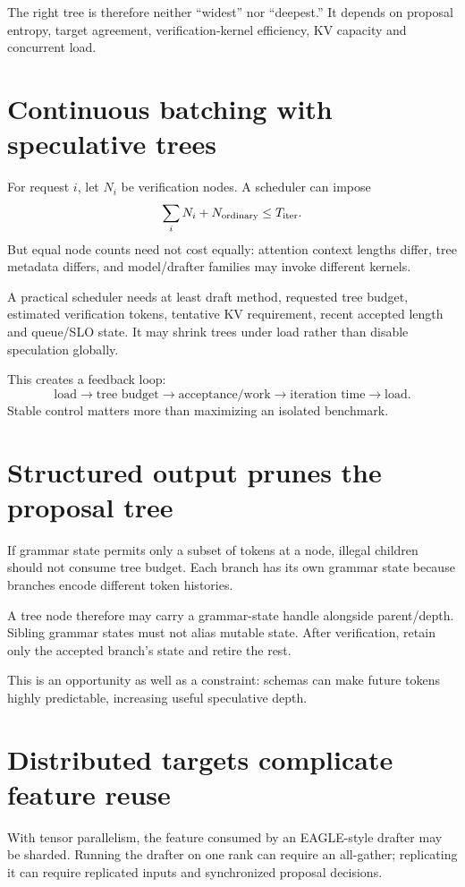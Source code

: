 The right tree is therefore neither ``widest'' nor ``deepest.'' It depends on proposal
entropy, target agreement, verification-kernel efficiency, KV capacity and concurrent
load.

\section{Continuous batching with speculative trees}

For request $i$, let $N_i$ be verification nodes. A scheduler can impose
\[
\sum_i N_i + N_{\rm ordinary}\le T_{\rm iter}.
\]
But equal node counts need not cost equally: attention context lengths differ, tree
metadata differs, and model/drafter families may invoke different kernels.

A practical scheduler needs at least draft method, requested tree budget, estimated
verification tokens, tentative KV requirement, recent accepted length and queue/SLO
state. It may shrink trees under load rather than disable speculation globally.

This creates a feedback loop:
\[
\text{load}\rightarrow\text{tree budget}\rightarrow
\text{acceptance/work}\rightarrow\text{iteration time}\rightarrow\text{load}.
\]
Stable control matters more than maximizing an isolated benchmark.

\section{Structured output prunes the proposal tree}

If grammar state permits only a subset of tokens at a node, illegal children should
not consume tree budget. Each branch has its own grammar state because branches encode
different token histories.

A tree node therefore may carry a grammar-state handle alongside parent/depth. Sibling
grammar states must not alias mutable state. After verification, retain only the
accepted branch's state and retire the rest.

This is an opportunity as well as a constraint: schemas can make future tokens highly
predictable, increasing useful speculative depth.

\section{Distributed targets complicate feature reuse}

With tensor parallelism, the feature consumed by an EAGLE-style drafter may be sharded.
Running the drafter on one rank can require an all-gather; replicating it can require
replicated inputs and synchronized proposal decisions.

